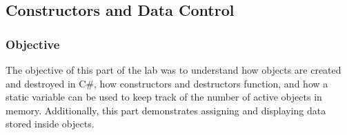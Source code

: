 





\subsection{Constructors and Data Control}

\subsubsection{Objective}
The objective of this part of the lab was to understand how objects are created and destroyed in C\#, how constructors and destructors function, and how a static variable can be used to keep track of the number of active objects in memory. Additionally, this part demonstrates assigning and displaying data stored inside objects.

